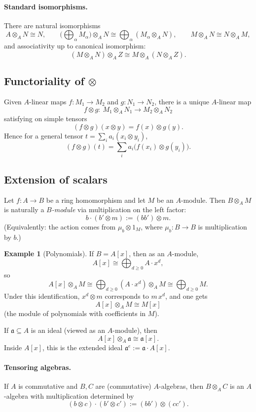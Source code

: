 \documentclass[11pt,a4paper]{article}
\theoremstyle{definition}
\newtheorem{example}[definition]{Example}
\theoremstyle{plain}
\theoremstyle{remark}
\begin{document}
\paragraph{Standard isomorphisms.}
There are natural isomorphisms
\[
A\otimes_A N \cong N,\qquad
\Big(\bigoplus_\alpha M_\alpha\Big)\otimes_A N \cong \bigoplus_\alpha (M_\alpha\otimes_A N),
\qquad
M\otimes_A N \cong N\otimes_A M,
\]
and associativity up to canonical isomorphism:
\[
(M\otimes_A N)\otimes_A Z \cong M\otimes_A (N\otimes_A Z).
\]

\subsection*{Functoriality of \texorpdfstring{$\otimes$}{tensor}}

Given $A$-linear maps $f:M_1\to M_2$ and $g:N_1\to N_2$, there is a unique $A$-linear map
\[
f\otimes g:\ M_1\otimes_A N_1 \to M_2\otimes_A N_2
\]
satisfying on simple tensors
\[
(f\otimes g)(x\otimes y)=f(x)\otimes g(y).
\]
Hence for a general tensor $t=\sum_i a_i(x_i\otimes y_i)$,
\[
(f\otimes g)(t)=\sum_i a_i\big(f(x_i)\otimes g(y_i)\big).
\]

\subsection*{Extension of scalars}

Let $f:A\to B$ be a ring homomorphism and let $M$ be an $A$-module. Then $B\otimes_A M$
is naturally a \emph{$B$-module} via multiplication on the left factor:
\[
b\cdot (b'\otimes m) := (bb')\otimes m.
\]
(Equivalently: the action comes from $\mu_b\otimes 1_M$, where $\mu_b:B\to B$ is multiplication by $b$.)

\begin{example}[Polynomials]
If $B=A[x]$, then as an $A$-module,
\[
A[x]\cong \bigoplus_{d\ge 0} A\cdot x^d,
\]
so
\[
A[x]\otimes_A M \cong \bigoplus_{d\ge 0} (A\cdot x^d)\otimes_A M \cong \bigoplus_{d\ge 0} M.
\]
Under this identification, $x^d\otimes m$ corresponds to $m\,x^d$, and one gets
\[
A[x]\otimes_A M \cong M[x]
\]
(the module of polynomials with coefficients in $M$).

If $\mathfrak a\subseteq A$ is an ideal (viewed as an $A$-module), then
\[
A[x]\otimes_A \mathfrak a \cong \mathfrak a[x].
\]
Inside $A[x]$, this is the extended ideal $\mathfrak a^e := \mathfrak a\cdot A[x]$.
\end{example}

\paragraph{Tensoring algebras.}
If $A$ is commutative and $B,C$ are (commutative) $A$-algebras, then $B\otimes_A C$ is an $A$-algebra with multiplication determined by
\[
(b\otimes c)\cdot(b'\otimes c') := (bb')\otimes (cc').
\]
\end{document}
